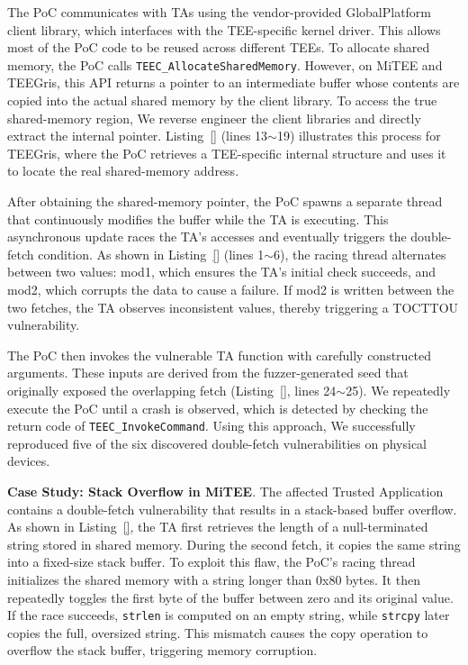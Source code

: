 The PoC communicates with TAs using the vendor-provided GlobalPlatform client library, which interfaces with the TEE-specific kernel driver. This allows most of the PoC code to be reused across different TEEs. To allocate shared memory, the PoC calls {\tt TEEC\_AllocateSharedMemory}. However, on MiTEE and TEEGris, this API returns a pointer to an intermediate buffer whose contents are copied into the actual shared memory by the client library. To access the true shared-memory region, We reverse engineer the client libraries and directly extract the internal pointer. Listing~\ref{} (lines 13$\sim$19) illustrates this process for TEEGris, where the PoC retrieves a TEE-specific internal structure and uses it to locate the real shared-memory address.

After obtaining the shared-memory pointer, the PoC spawns a separate thread that continuously modifies the buffer while the TA is executing. This asynchronous update races the TA’s accesses and eventually triggers the double-fetch condition. As shown in Listing~\ref{} (lines 1$\sim$6), the racing thread alternates between two values: mod1, which ensures the TA’s initial check succeeds, and mod2, which corrupts the data to cause a failure. If mod2 is written between the two fetches, the TA observes inconsistent values, thereby triggering a TOCTTOU vulnerability.

The PoC then invokes the vulnerable TA function with carefully constructed arguments. These inputs are derived from the fuzzer-generated seed that originally exposed the overlapping fetch (Listing~\ref{}, lines 24$\sim$25). We repeatedly execute the PoC until a crash is observed, which is detected by checking the return code of {\tt TEEC\_InvokeCommand}. Using this approach, We successfully reproduced five of the six discovered double-fetch vulnerabilities on physical devices.


\begin{figure}[h]
    
    \label{lst:soterbug}
\end{figure}

{\bf Case Study: Stack Overflow in MiTEE}.
The affected Trusted Application contains a double-fetch vulnerability that results in a stack-based buffer overflow. As shown in Listing~\ref{}, the TA first retrieves the length of a null-terminated string stored in shared memory. During the second fetch, it copies the same string into a fixed-size stack buffer.
To exploit this flaw, the PoC’s racing thread initializes the shared memory with a string longer than 0x80 bytes. It then repeatedly toggles the first byte of the buffer between zero and its original value. If the race succeeds, {\tt strlen} is computed on an empty string, while {\tt strcpy} later copies the full, oversized string. This mismatch causes the copy operation to overflow the stack buffer, triggering memory corruption.



